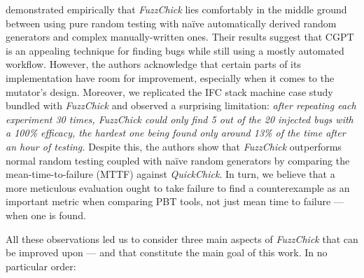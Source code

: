 \documentclass[sigconf, anonymous]{acmart}
\newcommand{\fuzzchick}{\textit{FuzzChick}\xspace}
\begin{document}
\citeauthor{lampropoulos2019coverage} demonstrated empirically that \fuzzchick
lies comfortably in the middle ground between using pure random testing with
na\"ive automatically derived random generators and complex manually-written
ones.
%
Their results suggest that CGPT is an appealing technique for finding bugs while
still using a mostly automated workflow.
%
However, the authors acknowledge that certain parts of its implementation have
room for improvement, especially when it comes to the mutator's design.
%
Moreover, we replicated the IFC stack machine case study bundled with \fuzzchick
and observed a surprising limitation:
%
\emph{after repeating each experiment 30 times, \fuzzchick could only find 5 out
  of the 20 injected bugs with a 100\% efficacy, the hardest one being found
  only around 13\% of the time after an hour of testing.}
%
Despite this, the authors show that \fuzzchick outperforms normal random testing
coupled with na\"ive random generators by comparing the mean-time-to-failure
(MTTF) against \emph{QuickChick}.
%
In turn, we believe that a more meticulous evaluation ought to take failure to find a
counterexample as an important metric when comparing PBT tools, not just mean
time to failure --- when one is found.
%


All these observations led us to consider three main aspects of \fuzzchick that
can be improved upon --- and that constitute the main goal of this work.
%
%
%
In no particular order:
\end{document}
